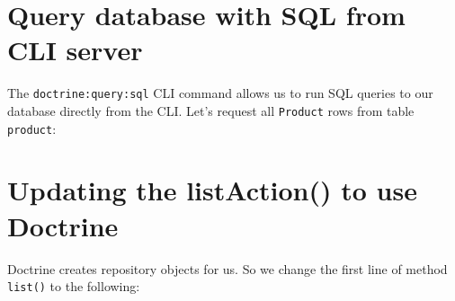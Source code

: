 \documentclass[a4paperpaper,openright]{book}
\newenvironment{Shaded}{}{}
\newcommand{\ExtensionTok}[1]{#1}
\newcommand{\KeywordTok}[1]{\textcolor[rgb]{0.00,0.44,0.13}{\textbf{#1}}}
\newcommand{\NormalTok}[1]{#1}
\newcommand{\OperatorTok}[1]{\textcolor[rgb]{0.40,0.40,0.40}{#1}}
\newcommand{\OtherTok}[1]{\textcolor[rgb]{0.00,0.44,0.13}{#1}}
\newcommand{\StringTok}[1]{\textcolor[rgb]{0.25,0.44,0.63}{#1}}
\begin{document}
\hypertarget{query-database-with-sql-from-cli-server}{%
\section{Query database with SQL from CLI
server}\label{query-database-with-sql-from-cli-server}}

The \texttt{doctrine:query:sql} CLI command allows us to run SQL queries
to our database directly from the CLI. Let's request all
\texttt{Product} rows from table \texttt{product}:

\begin{Shaded}
\end{Shaded}

\hypertarget{updating-the-listaction-to-use-doctrine}{%
\section{Updating the listAction() to use
Doctrine}\label{updating-the-listaction-to-use-doctrine}}

Doctrine creates repository objects for us. So we change the first line
of method \texttt{list()} to the following:

\begin{Shaded}
\end{Shaded}
\end{document}
